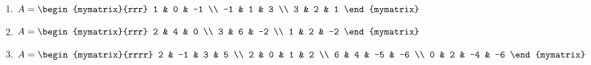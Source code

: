 \begin{enumialphparenastyle}
\begin{ex}
\begin{enumerate}
\item
$A = \begin{mymatrix}{rrr}
1 & 0 & -1 \\
-1 & 1 & 3 \\
3 & 2 & 1 
\end{mymatrix}$

\item 
$A = \begin{mymatrix}{rrr}
2 & 4 & 0 \\
3 & 6 & -2 \\
1 & 2 & -2
\end{mymatrix}$ 

\item 
$ A = \begin{mymatrix}{rrrr}
2 & -1 & 3 & 5 \\
2 & 0 & 1 & 2 \\
6 & 4 & -5 & -6 \\
0 & 2 & -4 & -6 
\end{mymatrix}$

\end{enumerate}
\end{ex}


\end{enumialphparenastyle}

